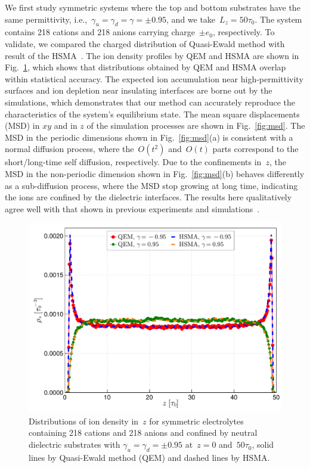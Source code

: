 We first study symmetric systems where the top and bottom substrates have the same permittivity, i.e.,~$\gamma_u = \gamma_d = \gamma = \pm 0.95$, and we take~$L_z = 50 \tau_0$.
The system contains 218 cations and 218 anions carrying charge~$\pm e_0$, respectively.
To validate, we compared the charged distribution of Quasi-Ewald method with result of the HSMA~\cite{liang2020harmonic}.
The ion density profiles by QEM and HSMA are shown in Fig.~\ref{fig:MD}, which shows that distributions obtained by QEM and HSMA overlap within statistical accuracy. 
The expected ion accumulation near high-permittivity surfaces and ion depletion near insulating interfaces are borne out by the simulations, which demonstrates that our method can accurately reproduce the characteristics of the system's equilibrium state.
The mean square displacements (MSD) in $xy$ and in $z$ of the simulation processes are shown in Fig.~\ref{fig:msd}.
The MSD in the periodic dimensions shown in Fig.~\ref{fig:msd}(a) is consistent with a normal diffusion process, where the~$O(t^2)$ and~$O(t)$ parts correspond to the short/long-time self diffusion, respectively.
Due to the confinements in~$z$, the MSD in the non-periodic dimension shown in Fig.~\ref{fig:msd}(b) behaves differently as a sub-diffusion process, where the MSD stop growing at long time, indicating the ions are confined by the dielectric interfaces.
The results here qualitatively agree well with that shown in previous experiments and simulations~\cite{das2010single, neusius2009subdiffusion}.

\begin{figure}[htbp]
    \centering
    \includegraphics[width = 0.8 \linewidth]{figs/compare_HSMA.pdf}
    \caption{
        Distributions of ion density in~$z$ for symmetric electrolytes containing 218 cations and 218 anions and confined by neutral dielectric substrates with $\gamma_u = \gamma_d = \pm 0.95$ at~$z = 0$ and~$50\tau_0$, solid lines by Quasi-Ewald method (QEM) and dashed lines by HSMA.
    }
    \label{fig:MD}
\end{figure}

